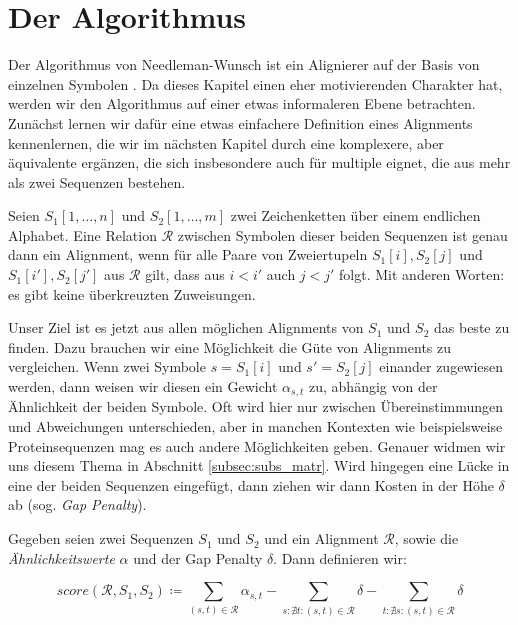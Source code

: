 \section{Der Algorithmus}

Der Algorithmus von Needleman-Wunsch ist ein Alignierer auf der Basis von einzelnen Symbolen \cite{nw70}. Da dieses Kapitel einen eher motivierenden Charakter hat, werden wir den Algorithmus auf einer etwas informaleren Ebene betrachten. Zunächst lernen wir dafür eine etwas einfachere Definition eines Alignments kennenlernen, die wir im nächsten Kapitel durch eine komplexere, aber äquivalente ergänzen, die sich insbesondere auch für multiple eignet, die aus mehr als zwei Sequenzen bestehen.

\begin{definition}
	Seien $S_1[1,\dots, n]$ und $S_2[1,\dots,m]$ zwei Zeichenketten über einem endlichen Alphabet. Eine Relation $\mathcal{R}$ zwischen Symbolen dieser beiden Sequenzen ist genau dann ein Alignment, wenn für alle Paare von Zweiertupeln $S_1[i],S_2[j]$ und $S_1[i'],S_2[j']$ aus $\mathcal{R}$ gilt, dass aus $i < i'$ auch $j < j'$ folgt. Mit anderen Worten: es gibt keine überkreuzten Zuweisungen.
\end{definition}

Unser Ziel ist es jetzt aus allen möglichen Alignments von $S_1$ und $S_2$ das beste zu finden. Dazu brauchen wir eine Möglichkeit die Güte von Alignments zu vergleichen. Wenn zwei Symbole $s = S_1[i]$ und $s' = S_2[j]$ einander zugewiesen werden, dann weisen wir diesen ein Gewicht $\alpha_{s,t}$ zu, abhängig von der Ähnlichkeit der beiden Symbole. Oft wird hier nur zwischen Übereinstimmungen und Abweichungen unterschieden, aber in manchen Kontexten wie beispielsweise Proteinsequenzen mag es auch andere Möglichkeiten geben. Genauer widmen wir uns diesem Thema in Abschnitt \ref{subsec:subs_matr}. Wird hingegen eine Lücke in eine der beiden Sequenzen eingefügt, dann ziehen wir dann Kosten in der Höhe $\delta$ ab (sog. \emph{Gap Penalty}).

\begin{definition}
	Gegeben seien zwei Sequenzen $S_1$ und $S_2$ und ein Alignment $\mathcal{R}$, sowie die \emph{Ähnlichkeitswerte} $\alpha$ und  der Gap Penalty $\delta$. Dann definieren wir:
	
	\begin{equation}
	score(\mathcal{R},S_1,S_2) \coloneqq \sum_{(s,t)\in \mathcal{R}}{\alpha_{s,t}} - \sum_{s : \nexists t : (s,t)\in \mathcal{R}}{\delta} - \sum_{t : \nexists s : (s,t)\in \mathcal{R}}{\delta}
	\end{equation}
\end{definition}

